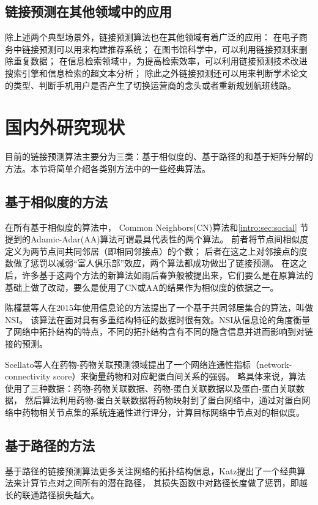 \subsection{链接预测在其他领域中的应用}
除上述两个典型场景外，链接预测算法也在其他领域有着广泛的应用：
在电子商务中链接预测可以用来构建推荐系统；
在图书馆科学中，可以利用链接预测来删除重复数据；
在信息检索领域中，为提高检索效率，可以利用链接预测技术改进搜索引擎和信息检索的超文本分析\cite{李淑玲2012基于相似性的链接预测方法研究}；
除此之外链接预测还可以用来判断学术论文的类型、判断手机用户是否产生了切换运营商的念头\cite{李淑玲2012基于相似性的链接预测方法研究}或者重新规划航班线路。


\section{国内外研究现状}
\label{intro:sec:study}
目前的链接预测算法主要分为三类：基于相似度的、基于路径的和基于矩阵分解的方法\cite{lu2009similarity}。本节将简单介绍各类别方法中的一些经典算法。

\subsection{基于相似度的方法}
在所有基于相似度的算法中，
Common Neighbors(CN)算法和\ref{intro:sec:social} 节提到的Adamic-Adar(AA)算法可谓最具代表性的两个算法。
前者将节点间相似度定义为两节点间共同邻居（即相同邻接点）的个数；
后者在这之上对邻接点的度数做了惩罚以减弱“富人俱乐部”效应，两个算法都成功做出了链接预测。
在这之后，许多基于这两个方法的新算法如雨后春笋般被提出来，它们要么是在原算法的基础上做了改动，要么是使用了CN或AA的结果作为相似度的依据之一。


陈槿慧等人在2015年使用信息论的方法提出了一个基于共同邻居集合的算法，叫做NSI。
该算法在面对具有多重结构特征的数据时很有效。NSI从信息论的角度衡量了网络中拓扑结构的特点，不同的拓扑结构含有不同的隐含信息并进而影响到对链接的预测\cite{chen2014robust}。


Scellato等人在药物-药物关联预测领域提出了一个网络连通性指标（network-connectivity score）来衡量药物和对应靶蛋白间关系的强弱。
略具体来说，算法使用了三种数据：药物-药物关联数据、药物-蛋白关联数据以及蛋白-蛋白关联数据，
然后算法利用药物-蛋白关联数据将药物映射到了蛋白网络中，通过对蛋白网络中药物相关节点集的系统连通性进行评分，计算目标网络中节点对的相似度\cite{scellato2011exploiting}。


\subsection{基于路径的方法}
基于路径的链接预测算法更多关注网络的拓扑结构信息，Katz提出了一个经典算法来计算节点对之间所有的潜在路径，
其损失函数中对路径长度做了惩罚，即越长的联通路径损失越大\cite{elhamifar2013sparse}。


